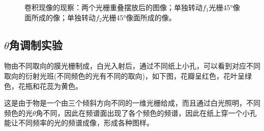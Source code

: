 \documentclass[a4paper]{article}
\begin{document}
\begin{figure}[H]
\begin{subfigure}[t]{0.3\textwidth}
        \caption{}
        \label{fig8-5}
    \end{subfigure}
    \caption{卷积现像的现察：两个光栅重叠摆放后的图像；单独转动$f_1$光栅\ang{45;;}像面所成的像；单独转动$f_2$光栅\ang{45;;}像面所成的像。}
\end{figure}
\subsection{$\theta$角调制实验}


\hspace{2em} 物由不同取向的膜光栅制成，白光入射后，通过不同纸上小孔，可以看到对应不同取向的衍射光班(不同频色的光有不同的取向)，如下图，花瓣呈红色，花叶呈绿色，花瓶和花蕊为黄色。 \par

\hspace{2em} 这是由于物是一个由三个倾斜方向不同的一维光栅给成，而且通过白光照明，不同频色的光$\theta$角不同，因此在频谱面出现了各个频色的频谱，因此在纸上穿一个小孔能让不同频率的光的频谱成像，形成各种图样。 \par
\end{document}
